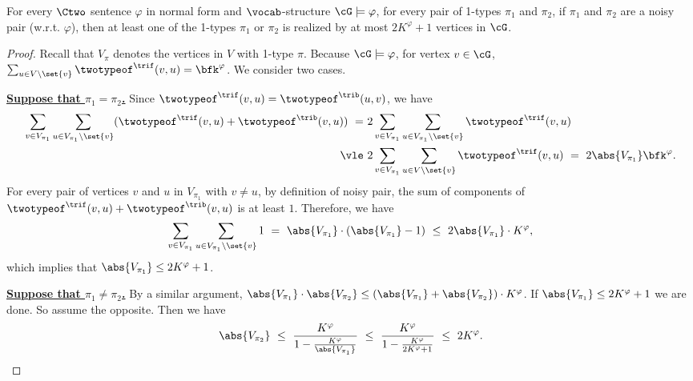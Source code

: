 \begin{lemma} \label{lem:differentiated}
    For every $\Ctwo$ sentence $\varphi$ in normal form and $\vocab$-structure $\cG \models \varphi$,
    for every pair of 1-types $\pi_1$ and $\pi_2$,
    if $\pi_1$ and $\pi_2$ are a noisy pair (w.r.t. $\varphi$), then
    at least one of the 1-types $\pi_1$ or $\pi_2$ is realized by at most $2K^\varphi+1$ vertices in $\cG$.
\end{lemma}

\begin{proof}
    
    Recall that $V_{\pi}$ denotes the vertices in $V$ with 1-type $\pi$.
    Because $\cG \models \varphi$, for vertex $v \in \cG$,
    $\sum_{u \in V \setminus \set{v}} \twotypeof^\trif(v, u) = \bfk^\varphi$.
    We consider two cases.

    \textbf{\uline{Suppose that $\pi_1 = \pi_2$.}}
    Since $\twotypeof^\trif(v, u) = \twotypeof^\trib(u, v)$,
    we have
    \begin{equation*}
        \begin{aligned}
            \sum_{v \in V_{\pi_1}} \sum_{u \in V_{\pi_1} \setminus \set{v}}
            (\twotypeof^\trif(v, u) + \twotypeof^\trib(v, u))
            \ =\ &
            2 \sum_{v \in V_{\pi_1}} \sum_{u \in V_{\pi_1} \setminus \set{v}}
            \twotypeof^\trif(v, u) \\
            \ \vle\ &
            2 \sum_{v \in V_{\pi_1}} \sum_{u \in V \setminus \set{v}} \twotypeof^\trif(v, u)
            \ =\ 2\abs{V_{\pi_1}} \bfk^\varphi.
        \end{aligned}
    \end{equation*}
    For every pair of vertices $v$ and $u$ in $V_{\pi_1}$ with $v \neq u$,
    by definition of noisy pair,
    the sum of components of $\twotypeof^\trif(v, u) + \twotypeof^\trib(v, u)$ is at least $1$.
    Therefore, we have
    \begin{equation*}
        \sum_{v \in V_{\pi_1}} \sum_{u \in V_{\pi_1} \setminus \set{v}} 1
        \ =\ \abs{V_{\pi_1}}\cdot(\abs{V_{\pi_1}} - 1)
        \ \le\ 2\abs{V_{\pi_1}} \cdot K^\varphi,
    \end{equation*}
    which implies that $\abs{V_{\pi_1}} \le 2K^\varphi + 1$. %
    
    \textbf{\uline{Suppose that $\pi_1 \neq \pi_2$.}}
    By a similar argument, 
    $\abs{V_{\pi_1}} \cdot \abs{V_{\pi_2}} \le (\abs{V_{\pi_1}} + \abs{V_{\pi_2}}) \cdot K^\varphi$.
    If $\abs{V_{\pi_1}} \leq 2K^\varphi+1$ we are done. So assume the opposite.
    Then we have
    \begin{equation*}
        \abs{V_{\pi_2}}
        \ \le\ 
        \frac{K^\varphi}{1-\frac{K^\varphi}{\abs{V_{\pi_1}}}}
        \ \le\ 
        \frac{K^\varphi}{1-\frac{K^\varphi}{2K^\varphi + 1}}
        \ \le\ 
        2K^\varphi.
    \end{equation*}
\end{proof}

